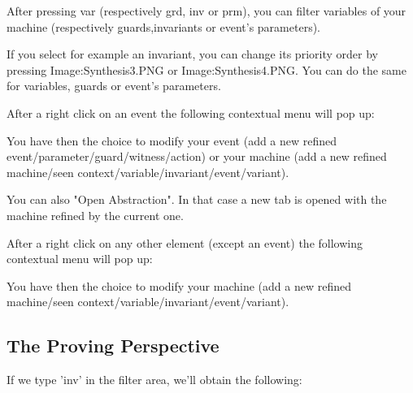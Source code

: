 After pressing var (respectively grd, inv or prm), you can filter variables of your machine (respectively guards,invariants or event's parameters).

If you select for example an invariant, you can change its priority order by pressing Image:Synthesis3.PNG‎ or Image:Synthesis4.PNG‎. You can do the same for variables, guards or event's parameters.

After a right click on an event the following contextual menu will pop up:


You have then the choice to modify your event (add a new refined event/parameter/guard/witness/action) or your machine (add a new refined machine/seen context/variable/invariant/event/variant).

You can also "Open Abstraction". In that case a new tab is opened with the machine refined by the current one.

After a right click on any other element (except an event) the following contextual menu will pop up:


You have then the choice to modify your machine (add a new refined machine/seen context/variable/invariant/event/variant). 

\subsection{The Proving Perspective}
\label{ref_01_proving_perspective}

If we type 'inv' in the filter area, we'll obtain the following:

